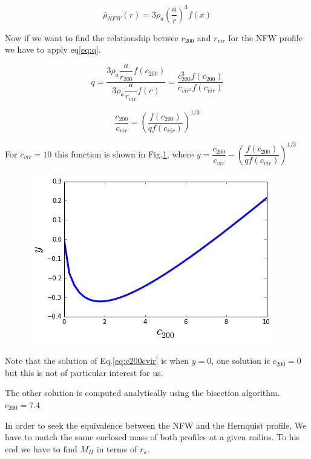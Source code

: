 \begin{equation}
\bar \rho_{NFW}(r) = 3 \rho_a \left( \dfrac{a}{r} \right)^{3}  f(x)
\end{equation}

Now if we want to find the relationship betwee $r_{200}$ and $r_{vir}$
for the NFW profile we have to apply eq\ref{eq:q}.

\begin{equation}
q = \dfrac{3 \rho_a \dfrac{a}{r_{200}} f(c_{200})}{3 \rho_a \dfrac{a}{r_{vir}}f(c)} = \dfrac{c_{200}^{3}f(c_{200})}{c_{vir^3}f(c_{vir})}
\end{equation}


\begin{equation}\label{eq:c200cvir}
\dfrac{c_{200}}{c_{vir}} = \left( \dfrac{f(c_{200})}{qf(c_{vir})} \right)^{1/3}
\end{equation}

For $c_{vir} = 10$ this function is shown in Fig.\ref{fig:c200cvir}, where
$y = \dfrac{c_{200}}{c_{vir}} - \left( \dfrac{f(c_{200})}{qf(c_{vir})} \right)^{1/3}$

\begin{figure}[H]\label{fig:c200cvir}
\centering
\includegraphics[scale=0.7]{../figures/c200cvir.png}
\end{figure}

Note that the solution of Eq.\ref{eq:c200cvir} is when $y=0$, one
solution is $c_{200}=0$ but this is not of particular interest for us.

The other solution is computed analytically using the bisection algorithm.
$c_{200} = 7.4$

In order to seek the equivalence between the NFW and the Hernquist profile,
We have to match the same enclosed mass of both profiles at a given radius.
To his end we have to find $M_H$ in terms of $r_s$.

